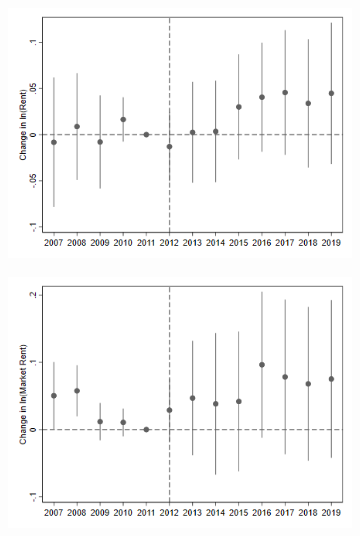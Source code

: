 \documentclass[12pt]{article}
\begin{document}
{{{{{{\begin{figure}
\begin{center}
\begin{subfigure}[b]{0.4\textwidth}
\centering
{}
\includegraphics[scale=0.51]{Voucher Rents/R24 High Surge LowIncome_tract.png}
\label{fig:vouchlowinc}
\end{subfigure}
\hfill
\begin{subfigure}[b]{0.4\textwidth}
\includegraphics[scale=0.51]{Voucher Rents/R24 High Surge HighIncome_tract.png}
\label{fig:vouchhighinc}
\end{subfigure}
\end{center}
\end{figure}

}}}}}}
\end{document}
